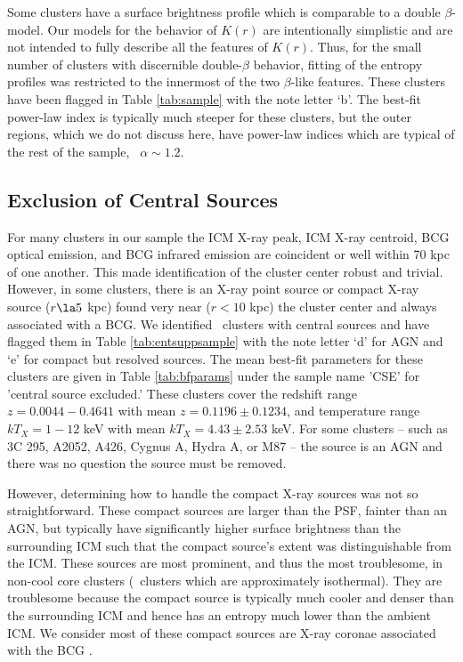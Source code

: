 Some clusters have a surface brightness profile which is comparable to
a double $\beta$-model. Our models for the behavior of $K(r)$ are
intentionally simplistic and are not intended to fully describe all
the features of $K(r)$. Thus, for the small number of clusters with
discernible double-$\beta$ behavior, fitting of the entropy profiles
was restricted to the innermost of the two $\beta$-like
features. These clusters have been flagged in Table \ref{tab:sample}
with the note letter `b'. The best-fit power-law index is typically
much steeper for these clusters, but the outer regions, which we do
not discuss here, have power-law indices which are typical of the rest
of the sample, \ie\ $\alpha \sim 1.2$.


\subsection{Exclusion of Central Sources}
\label{sec:entsuppcentsrc}

For many clusters in our sample the ICM X-ray peak, ICM X-ray
centroid, BCG optical emission, and BCG infrared emission are
coincident or well within 70 kpc of one another. This made
identification of the cluster center robust and trivial. However, in
some clusters, there is an X-ray point source or compact X-ray source
($r \la 5$ kpc) found very near ($r < 10$ kpc) the cluster center and
always associated with a BCG. We identified \centsrcnum\ clusters with
central sources and have flagged them in Table \ref{tab:entsuppsample} with
the note letter `d' for AGN and `e' for compact but resolved
sources. The mean best-fit parameters for these clusters are given in
Table \ref{tab:bfparams} under the sample name 'CSE' for 'central
source excluded.' These clusters cover the redshift range $z =
0.0044-0.4641$ with mean $z = 0.1196 \pm 0.1234$, and temperature
range $kT_X = 1-12$ keV with mean $kT_X = 4.43 \pm 2.53$ keV. For some
clusters -- such as 3C 295, A2052, A426, Cygnus A, Hydra A, or M87 --
the source is an AGN and there was no question the source must be
removed.

However, determining how to handle the compact X-ray sources was not
so straightforward. These compact sources are larger than the PSF,
fainter than an AGN, but typically have significantly higher surface
brightness than the surrounding ICM such that the compact source's
extent was distinguishable from the ICM. These sources are most
prominent, and thus the most troublesome, in non-cool core clusters
(\ie\ clusters which are approximately isothermal). They are
troublesome because the compact source is typically much cooler and
denser than the surrounding ICM and hence has an entropy much lower
than the ambient ICM. We consider most of these compact sources are
X-ray coronae associated with the BCG \citep{coronae}.

